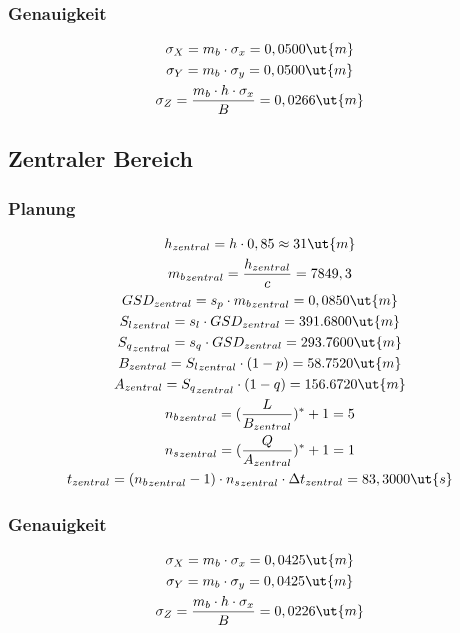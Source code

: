 \subsubsection{Genauigkeit}
\begin{gather*}
\sigma_X = m_b \cdot \sigma_x = 0,0500 \ut{m} \\
\sigma_Y = m_b \cdot \sigma_y = 0,0500 \ut{m} \\
\sigma_Z = \frac{m_b \cdot h \cdot \sigma_x}{B} = 0,0266 \ut{m}
\end{gather*}
\subsection{Zentraler Bereich}
\subsubsection{Planung}
\begin{gather*}
h_{zentral} = h \cdot 0,85 \approx 31 \ut{m} \\
{m_b}_{zentral}  = \frac{h_{zentral}}{c} = 7849,3 \\
GSD_{zentral} = s_p \cdot {m_b}_{zentral} = 0,0850 \ut{m} \\
{S_l}_{zentral} = s_l \cdot GSD_{zentral} = 391.6800 \ut{m} \\
{S_q}_{zentral} = s_q \cdot GSD_{zentral} = 293.7600 \ut{m} \\
B_{zentral} = {S_l}_{zentral} \cdot (1-p) = 58.7520 \ut{m} \\
A_{zentral} = {S_q}_{zentral} \cdot (1-q) = 156.6720 \ut{m} \\
{n_b}_{zentral} = (\frac{L}{B_{zentral}})^* + 1 = 5 \\
{n_s}_{zentral} = (\frac{Q}{A_{zentral}})^* + 1 = 1 \\	
t_{zentral} = ({n_b}_{zentral} - 1) \cdot {n_s}_{zentral} \cdot \Delta t_{zentral} = 83,3000 \ut{s} \\
\end{gather*}
\subsubsection{Genauigkeit}
\begin{gather*}
\sigma_X = m_b \cdot \sigma_x = 0,0425 \ut{m} \\
\sigma_Y = m_b \cdot \sigma_y = 0,0425 \ut{m} \\
\sigma_Z = \frac{m_b \cdot h \cdot \sigma_x}{B} = 0,0226 \ut{m}
\end{gather*}
\newpage